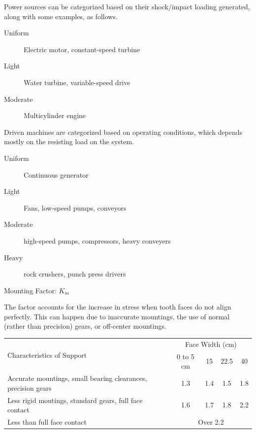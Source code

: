\documentclass[a4paper,openany]{tufte-book}
\begin{document}
Power sources can be categorized based on their shock/impact loading generated, along with some examples, as follows.

\begin{description}
\item[{Uniform}] Electric motor, constant-speed turbine

\item[{Light}] Water turbine, variable-speed drive

\item[{Moderate}] Multicylinder engine
\end{description}

Driven machines are categorized based on operating conditions, which depends mostly on the resisting load on the system.

\begin{description}
\item[{Uniform}] Continuous generator

\item[{Light}] Fans, low-speed pumps, conveyors

\item[{Moderate}] high-speed pumps, compressors, heavy conveyers

\item[{Heavy}] rock crushers, punch press drivers
\end{description}

Mounting Factor: \(K_{m}\)

The factor accounts for the increase in stress when tooth faces do not align perfectly. This can happen due to inaccurate mountings, the use of normal (rather than precision) gears, or off-center mountings.

\begin{center}
\begin{tabular}{p{6cm}cccc}
\toprule
\multirow{2}{6cm}{Characteristics of Support} & \multicolumn{4}{c}{Face Width (cm)} &  &  & \\
 & 0 to 5 cm & 15 & 22.5 & 40\\
\midrule
Accurate mountings, small bearing clearances, precision gears & 1.3 & 1.4 & 1.5 & 1.8\\
Less rigid moutings, standard gears, full face contact & 1.6 & 1.7 & 1.8 & 2.2\\
Less than full face contact & \multicolumn{4}{c}{Over 2.2} &  &  & \\
\bottomrule
\end{tabular}
\end{center}
\end{document}
